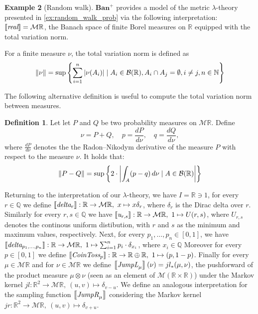 \documentclass[10pt,a4paper]{amsart}
\theoremstyle{definition}
\newtheorem{definition}{Definition}[section]
\theoremstyle{definition}
\newtheorem{example}[definition]{Example}
\theoremstyle{definition}
\theoremstyle{definition}
\theoremstyle{definition}
\theoremstyle{definition}
\begin{document}
  \begin{example}[Random walk]

    $\mathbf{Ban}^+$ provides a model of the metric $\lambda$-theory presented in \ref{ex:random_walk_prob}  via the following interpretation: $\left \llbracket \emph{real} \right \rrbracket = \mathcal{M}\mathbb{R}$, the Banach space of finite Borel measures on $\mathbb{R}$ equipped with the total  variation norm.

    For a finite measure $\nu$, the total variation norm is defined as
    \begin{align*}
      \left\lVert \nu \right\rVert = \sup \left\{ \sum_{i=1}^n |\nu(A_i)| \mid A_i \in \mathcal{B}(\mathbb{R}), A_i \cap A_j = \emptyset, i \neq j, n \in \mathbb{N} \right\}
    \end{align*}



    The following alternative definition is useful to compute the total variation norm between measures.

  \begin{definition} \cite{tsybakov2008}
    Let  let $P$ and $Q$ be two probability measures on $\mathcal{M}\mathbb{R}$. Define
    $$
      \nu = P + Q, \quad p = \frac{dP}{d\nu}, \quad q = \frac{dQ}{d\nu},
    $$
    where $\frac{dP}{d\nu}$ denotes the  the Radon–Nikodym derivative of the measure $P$ with respect to the measure $\nu$. It holds that:
    \begin{align*}
      \left\lVert P-Q \right\rVert = \sup \left\{ 2 \cdot \left\vert \int_{A} (p - q) \, d\nu \mid A \in  \mathcal{B}(\mathbb{R}) \right\vert \right\}
    \end{align*}
  \end{definition}
  
    Returning to the interpretation of our $\lambda$-theory, 
    we have $I = \mathbb{R} \ni 1$, 
    for every $r \in \mathbb{Q}$ we define $\left \llbracket \emph{delta}_r \right \rrbracket:\mathbb{R} \to \mathcal{M}\mathbb{R},\ x \mapsto x\delta_r$, where $\delta_r$ is the Dirac delta over $r$. 
    Similarly for every $r,s \in \mathbb{Q}$ we have $\left \llbracket \emph{u}_{r,s} \right \rrbracket:\mathbb{R} \to \mathcal{M}\mathbb{R},\ 1 \mapsto U(r,s) $, where $U_{r,s}$ denotes the continous uniform distibution, with $r$ and $s$ as the minimum and maximum values, respectively. 
    Next,  for every $p_1,\ldots,p_n \in [0,1]$, we have $\left \llbracket \emph{delta}_{p_1,\ldots,p_n} \right \rrbracket:\mathbb{R} \to \mathcal{M}\mathbb{R},\ 1 \mapsto \sum_{i=1}^n p_i\cdot \delta_{x_i}$, where $x_i \in \mathbb{Q}$
    Moreover  for every $p \in [0,1]$ we define $\left \llbracket \emph{CoinToss}_p \right \rrbracket:\mathbb{R} \to \mathbb{R} \oplus \mathbb{R},\ 1 \mapsto (p, 1-p)$. 
    Finally for every $\mu \in \mathcal{M}\mathbb{R}$ and for $\nu  \in \mathcal{M}\mathbb{R}$ we define $\left \llbracket \emph{JumpL}_\mu \right \rrbracket (\nu) = jl_{*}(\mu,\nu) $, the pushforward of the product measure $\mu \otimes \nu$ (seen as an element of $\mathcal{M}(\mathbb{R} \times \mathbb{R})$) under the Markov kernel $jl: \mathbb{R}^2 \to \mathcal{M}\mathbb{R},\ (u,v) \mapsto \delta_{v-u}$.  We define an analogous interpretation for the sampling function $\left \llbracket \emph{JumpR}_\mu \right \rrbracket$ considering the Markov kernel $jr: \mathbb{R}^2 \to \mathcal{M}\mathbb{R},\ (u,v) \mapsto \delta_{v+u}$.


\end{example}
\end{document}
